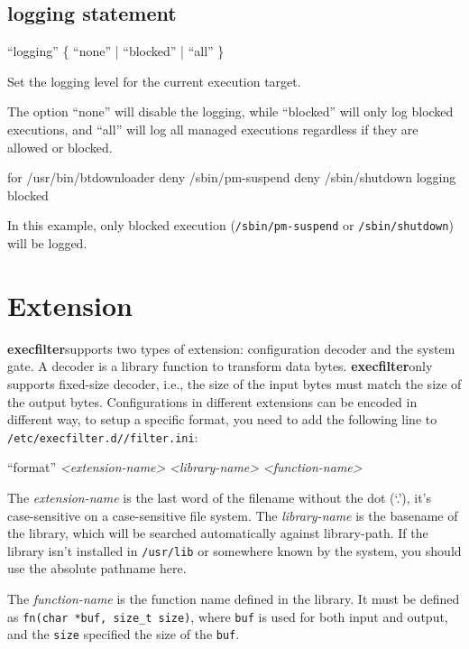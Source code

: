 \documentclass[hyperref, bookmark]{z-article}
\newcommand\code[1]{\texttt{#1}}
\newcommand\syntax[1]{
  \begin{mdframed}[
      linecolor=brown,
      linewidth=2pt,
    ]
    #1
  \end{mdframed}
}
\newcommand\xfilt{\textbf{execfilter}}
\newcommand\configdir{\texttt{/etc/execfilter.d/}}
\begin{document}
\subsection {logging statement}

\syntax {
    ``logging'' \{ ``none'' | ``blocked'' | ``all'' \}
}

Set the logging level for the current execution target.

The option ``none'' will disable the logging, while ``blocked'' will only log blocked executions,
and ``all'' will log all managed executions regardless if they are allowed or blocked.

\begin{codeblk}
    for /usr/bin/btdownloader
        deny /sbin/pm-suspend
        deny /sbin/shutdown
        logging blocked
\end{codeblk}

In this example, only blocked execution (\code{/sbin/pm-suspend} or \code{/sbin/shutdown}) will be logged.

\section {Extension}

\xfilt supports two types of extension: configuration decoder and the system
gate. A decoder is a library function to transform data bytes. \xfilt only
supports fixed-size decoder, i.e., the size of the input bytes must match the
size of the output bytes. Configurations in different extensions can be encoded
in different way, to setup a specific format, you need to add the following line
to \code{\configdir/filter.ini}:

\syntax{
  ``format''
  \textit{<extension-name>}
  \textit{<library-name>}
  \textit{<function-name>}
}

The \textit{extension-name} is the last word of the filename without the dot
(`.'), it's case-sensitive on a case-sensitive file system. The
\textit{library-name} is the basename of the library, which will be searched
automatically against library-path. If the library isn't installed in
\code{/usr/lib} or somewhere known by the system, you should use the absolute
pathname here.

The \textit{function-name} is the function name defined in the library. It must
be defined as \code{fn(char *buf, size\_t size)}, where \code{buf} is used for
both input and output, and the \code{size} specified the size of the \code{buf}.
\end{document}
